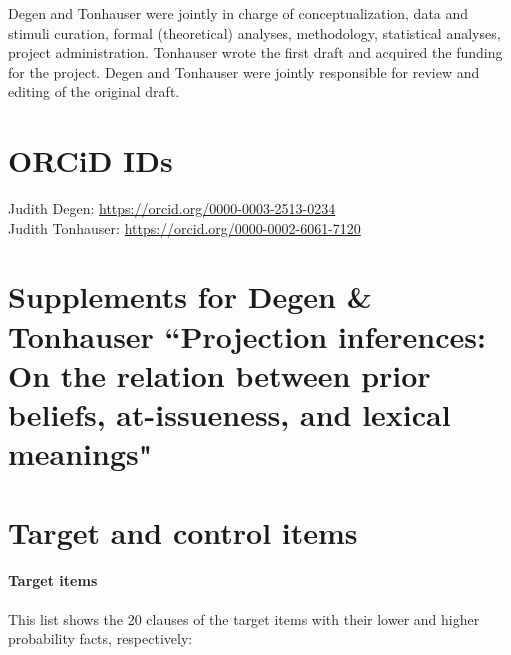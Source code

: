 \documentclass[11pt,fleqn]{article}
\newcommand{\6}{\mbox{$[\hspace*{-.6mm}[$}}
\newcommand{\9}{\mbox{$]\hspace*{-.6mm}]$}}
\renewcommand{\thefigure}{\textbf{\arabic{figure}}}
\renewcommand{\thetable}{\textbf{\arabic{table}}}
\begin{document}
Degen and Tonhauser were jointly in charge of conceptualization, data and stimuli curation, formal (theoretical) analyses, methodology, statistical analyses, project administration. Tonhauser wrote the first draft and acquired the funding for the project.  Degen and Tonhauser were jointly responsible for review and editing of the original draft.

\section*{ORCiD IDs}

Judith Degen: \url{https://orcid.org/0000-0003-2513-0234}
\\ Judith Tonhauser:  \url{https://orcid.org/0000-0002-6061-7120}





%



\newpage

\appendix

\setcounter{table}{0}
\renewcommand{\thetable}{A\arabic{table}}

\setcounter{figure}{0}
\renewcommand{\thefigure}{A\arabic{figure}}

\section*{Supplements for Degen \& Tonhauser ``Projection inferences: On the relation between prior beliefs, at-issueness, and lexical meanings"}

\section{Target and control items}\label{a-stim}

\paragraph{Target items} This list shows the 20 clauses of the target items with their lower and higher probability facts, respectively:
\end{document}
